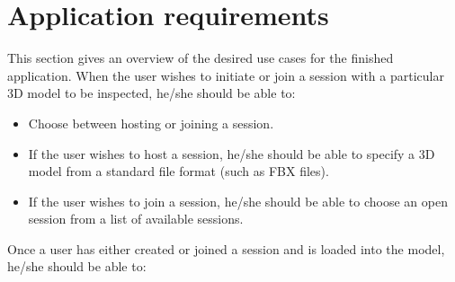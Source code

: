\section{Application requirements}
This section gives an overview of the desired use cases for the finished application. When the user
wishes to initiate or join a session with a particular 3D model to be inspected, he/she should be able to:
\begin{itemize}
	\item Choose between hosting or joining a session.
	\item If the user wishes to host a session, he/she should be able to specify a 3D model from a standard file format (such as FBX files).
	\item If the user wishes to join a session, he/she should be able to choose an open session from a list of available sessions.
\end{itemize}
Once a user has either created or joined a session and is loaded into the model, he/she should be able to:

